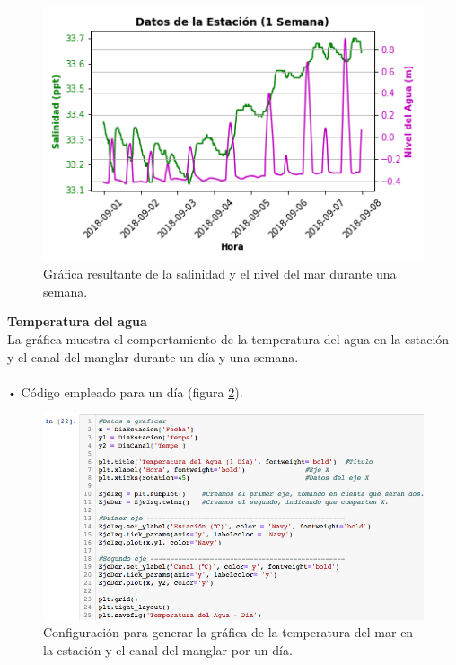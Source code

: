 \documentclass[12pt]{article}
\begin{document}
\begin{figure}[h!]
	\center
	\includegraphics[scale=.6]{Salinidad-y-Nivel-del-Agua-Semana}
	\caption{\label{fig:graf-sal-sem} Gráfica resultante de la salinidad y el nivel del mar durante una semana.}
\end{figure}
\noindent \textbf{Temperatura del agua} \\
La gráfica muestra el comportamiento de la temperatura del agua en la estación y el canal del manglar durante un día y una semana. \\
\\
• Código empleado para un día (figura \ref{fig:cod-temp-dia}). \\

\begin{figure}[h!]
	\center
	\includegraphics[scale=.6]{./Images/temp-dia}
	\caption{\label{fig:cod-temp-dia} Configuración para generar la gráfica de la temperatura del mar en la estación y el canal del manglar por un día.}
\end{figure}
\end{document}
